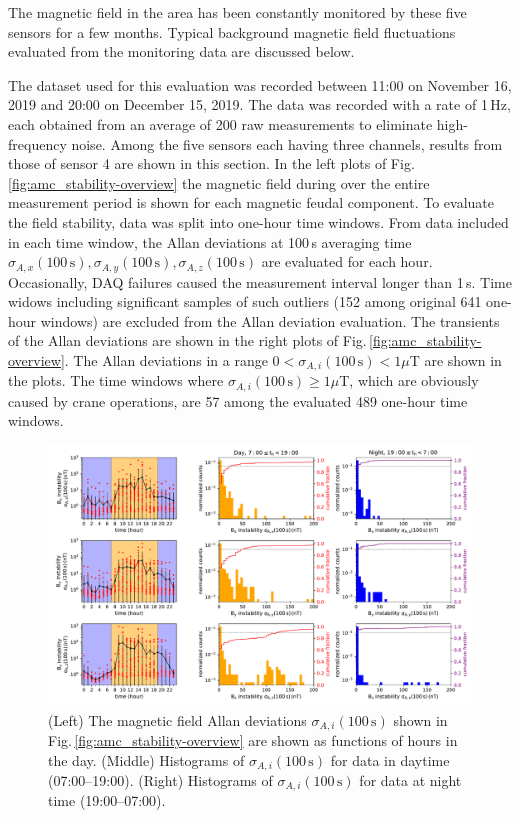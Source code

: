 The magnetic field in the area has been constantly monitored by these five sensors for a few months.  Typical background magnetic field fluctuations evaluated from the monitoring data are discussed below. 
 
 The dataset used for this evaluation was recorded between 11:00 on November 16, 2019 and 20:00 on December 15, 2019. The data was recorded with a rate of 1\,Hz, each obtained from an average of 200 raw measurements to eliminate high-frequency noise. Among the five sensors each having three channels, results from those of sensor 4 are shown in this section.   In the left plots of Fig.\,\ref{fig:amc_stability-overview} the magnetic field during over the entire measurement period is shown for each magnetic feudal component. To evaluate the field stability, data was split into one-hour time windows. From data included in each time window, the Allan deviations at 100\,s averaging time $\sigma_{A,x}(100\,\mathrm{s}), \sigma_{A,y}(100\,\mathrm{s}), \sigma_{A,z}(100\,\mathrm{s})$ are evaluated for each hour. Occasionally,  DAQ failures caused the measurement interval longer than 1\,s. Time widows including significant samples of such outliers (152 among original 641 one-hour windows) are excluded from the Allan deviation evaluation. 
The transients of the Allan deviations are shown in the right plots of Fig.\,\ref{fig:amc_stability-overview}.  The Allan deviations in a range $0<\sigma_{A,i} (100\,\mathrm{s})<1\mu$T are shown in the plots. The time windows  where $\sigma_{A,i} (100\,\mathrm{s})\geq 1\mu$T, which are obviously caused by crane operations,  are 57 among the evaluated 489 one-hour  time windows. 
 
\begin{figure}[tbp]
\centering 
\includegraphics[width=.98\textwidth]{graphics/AMC/stability_day_night_f3_100s.pdf}
\caption{(Left) The magnetic field Allan deviations $\sigma_{A,i}(100\,\mathrm{s})$  shown in Fig.\,\ref{fig:amc_stability-overview} are shown as functions of hours in the day. (Middle) Histograms of  $\sigma_{A,i}(100\,\mathrm{s})$  for data in  daytime (07:00--19:00). (Right) Histograms of  $\sigma_{A,i}(100\,\mathrm{s})$  for data at night time  (19:00--07:00). }
\label{fig:amc_stability-day-night}
\end{figure}

